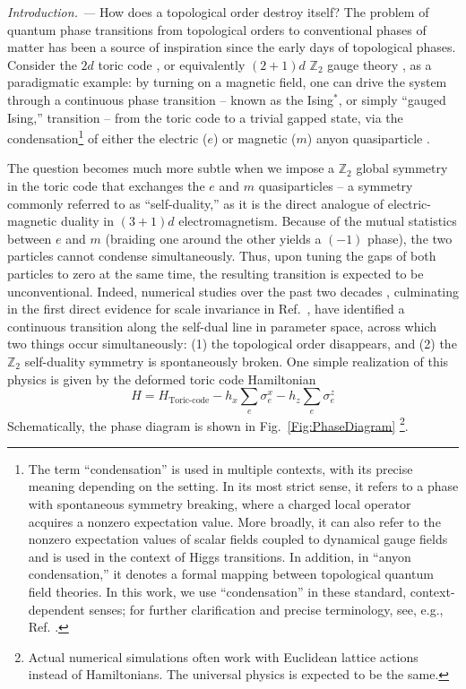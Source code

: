 \documentclass[aps, prl, superscriptaddress, twocolumn,
notitlepage, longbibliography,
floatfix]{revtex4-2}
\newcommand{\1}{\text{\uppercase\expandafter{\romannumeral1}}}
\newcommand{\2}{\text{\uppercase\expandafter{\romannumeral2}}}
\newcommand{\3}{\text{\uppercase\expandafter{\romannumeral3}}}
\newcommand{\4}{\text{\uppercase\expandafter{\romannumeral4}}}
\newcommand{\5}{\text{\uppercase\expandafter{\romannumeral5}}}
\newcommand{\6}{\text{\uppercase\expandafter{\romannumeral6}}}
\def\Z{\mathbb{Z}}
\begin{document}
\textit{Introduction. ---}
How does a topological order destroy itself? The problem of quantum phase transitions from topological orders to conventional phases of matter has been a source of inspiration since the early days of topological phases. Consider the $2d$ toric code \cite{Kitaev:1997wr}, or equivalently $(2+1)d$ $\Z_2$ gauge theory \cite{KogutReview}, as a paradigmatic example: by turning on a magnetic field, one can drive the system through a continuous phase transition -- known as the Ising$^*$, or simply ``gauged Ising,'' transition -- from the toric code to a trivial gapped state, via the condensation\footnote{The term ``condensation'' is used in multiple contexts, with its precise meaning depending on the setting. In its most strict sense, it refers to a phase with spontaneous symmetry breaking, where a charged local operator acquires a nonzero expectation value. More broadly, it can also refer to the nonzero expectation values of scalar fields coupled to dynamical gauge fields and is used in the context of Higgs transitions. In addition, in ``anyon condensation,'' it denotes a formal mapping between topological quantum field theories. In this work, we use ``condensation'' in these standard, context-dependent senses; for further clarification and precise terminology, see, e.g., Ref. .} of either the electric ($e$) or magnetic ($m$) anyon quasiparticle \cite{Wegner,FradkinShenker}.

The question becomes much more subtle when we impose a $\mathbb{Z}_2$ global symmetry in the toric code that exchanges the $e$ and $m$ quasiparticles -- a symmetry commonly referred to as ``self-duality,'' as it is the direct analogue of electric-magnetic duality in $(3+1)d$ electromagnetism. Because of the mutual statistics between $e$ and $m$ (braiding one around the other yields a $(-1)$ phase), the two particles cannot condense simultaneously. Thus, upon tuning the gaps of both particles to zero at the same time, the resulting transition is expected to be unconventional. Indeed, numerical studies over the past two decades \cite{TupitsynKitaevProkofEvStamp,VidalDusuelSchmidt,WuDengProkofev,SomozaSernaNahum,OppenheimKochJanuszGazitRingel,XuPollmannKnap}, culminating in the first direct evidence for scale invariance in Ref.~, have identified a continuous transition along the self-dual line in parameter space, across which two things occur simultaneously: (1) the topological order disappears, and (2) the $\mathbb{Z}_2$ self-duality symmetry is spontaneously broken. One simple realization of this physics is given by the deformed toric code Hamiltonian~\cite{TupitsynKitaevProkofEvStamp}
\begin{equation}
\label{eq:deformedTC}
    H=H_{\text{Toric-code}}-h_x\sum_e{\sigma^x_e}-h_z\sum_e \sigma^z_e
\end{equation}
Schematically, the phase diagram is shown in Fig.~\ref{Fig:PhaseDiagram} \footnote{Actual numerical simulations often work with Euclidean lattice actions instead of Hamiltonians. The universal physics is expected to be the same.}.
\end{document}
